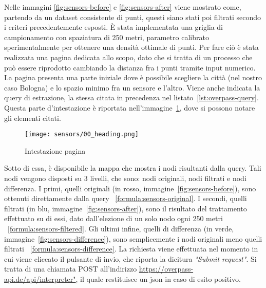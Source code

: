 Nelle immagini \ref{fig:sensors-before} e \ref{fig:sensors-after} viene mostrato come, partendo da un dataset
consistente di punti, questi siano stati poi filtrati secondo i criteri precedentemente esposti.
È stata implementata una griglia di campionamento con spaziatura di 250 metri, parametro calibrato
sperimentalmente per ottenere una densità ottimale di punti. Per fare ciò è stata realizzata una pagina dedicata
allo scopo, dato che si tratta di un processo che può essere riprodotto
cambiando la distanza fra i punti tramite input numerico.
La pagina presenta una parte iniziale dove è possibile scegliere la città (nel nostro caso Bologna) e lo spazio
minimo fra un sensore e l'altro. Viene anche indicata la query di estrazione,
la stessa citata in precedenza nel listato~\ref{lst:overpass-query}.
Questa parte d'intestazione è riportata nell'immagine~\ref{fig:sensors-heading}, dove si possono notare gli elementi
citati.

\begin{figure}[H]
  \centering
  \texttt{[image: sensors/00\_heading.png]}
  \caption{Intestazione pagina}
  \label{fig:sensors-heading}
\end{figure}

Sotto di essa, è disponibile la mappa che mostra i nodi risultanti dalla query.
Tali nodi vengono disposti su 3 livelli, che sono: nodi originali, nodi filtrati e nodi differenza.
I primi, quelli originali (in rosso, immagine~\ref{fig:sensors-before}),
sono ottenuti direttamente dalla query ~\ref{formula:sensors-original}.
I secondi, quelli filtrati (in blu, immagine~\ref{fig:sensors-after}), sono il risultato del trattamento effettuato
su di essi, dato dall'elezione di un solo nodo ogni 250 metri ~\ref{formula:sensors-filtered}.
Gli ultimi infine, quelli di differenza (in verde, immagine~\ref{fig:sensors-difference}),
sono semplicemente i nodi originali
meno quelli filtrati ~\ref{formula:sensors-difference}.
La richiesta viene effettuata nel momento in cui viene cliccato il pulsante di invio, che riporta la
dicitura \textit{"Submit request"}. Si tratta di una chiamata POST
all'indirizzo \url{https://overpass-api.de/api/interpreter"}, il quale restituisce un \acrshort{json} in caso di
esito positivo.


